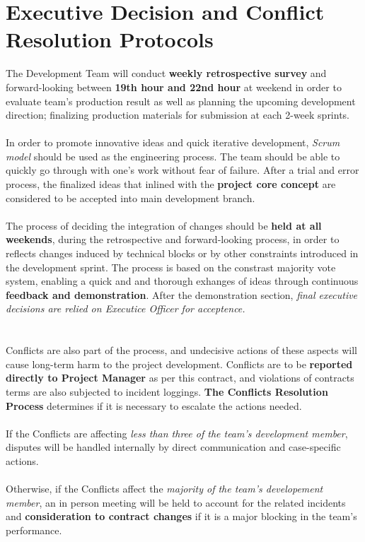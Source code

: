    \section{Executive Decision and Conflict Resolution Protocols}
    The Development Team will conduct \textbf{weekly retrospective survey} and forward-looking between \textbf{19th hour and 22nd hour} at weekend 
    in order to evaluate team's production result as well as planning the upcoming development direction; 
    finalizing production materials for submission at each 2-week sprints.
    \\\\
    In order to promote innovative ideas and quick iterative development, \textit{Scrum model} should be used as the engineering process. The team should be able
    to quickly go through with one's work without fear of failure. After a trial and error process, the finalized ideas that inlined with the \textbf{project core concept}
    are considered to be accepted into main development branch. 
    \\\\
    The process of deciding the integration of changes should be \textbf{held at all weekends}, during the retrospective and forward-looking process, in order to reflects
    changes induced by technical blocks or by other constraints introduced in the development sprint. The process is based on the constrast majority vote system, 
    enabling a quick and and thorough exhanges of ideas through continuous \textbf{feedback and demonstration}. After the demonstration section, \textit{final executive decisions are
    relied on Executice Officer for acceptence.}
    \\\\
    \\
    Conflicts are also part of the process, and undecisive actions of these aspects will cause long-term harm to the project development. Conflicts are to be \textbf{reported
    directly to Project Manager} as per this contract, and violations of contracts terms are also subjected to incident loggings. \textbf{The Conflicts Resolution Process} determines
    if it is necessary to escalate the actions needed.
    \\\\
    If the Conflicts are affecting \textit{less than three of the team's development member}, disputes will be handled internally
    by direct communication and case-specific actions. 
    \\\\
    Otherwise, if the Conflicts affect the \textit{majority of the team's developement member}, an in person meeting will be held
    to account for the related incidents and \textbf{consideration to contract changes} if it is a major blocking in the team's performance.

